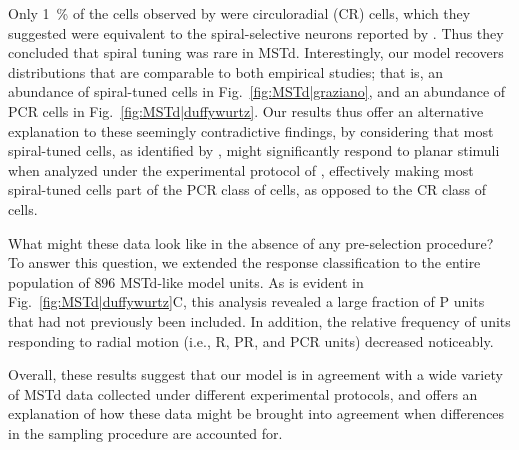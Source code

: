 Only \SI{1}{\percent} of the cells observed by \cite{DuffyWurtz1995} were
circuloradial (CR) cells, which they suggested were equivalent to the 
spiral-selective neurons reported by \cite{Graziano1994}. Thus they 
concluded that spiral tuning was rare in \ac{MSTd}. Interestingly, our 
model recovers distributions that are comparable to both empirical studies; 
that is, an abundance of spiral-tuned cells in Fig.~\ref{fig:MSTd|graziano},
and an abundance of PCR cells in Fig.~\ref{fig:MSTd|duffywurtz}. 
Our results thus offer an alternative explanation to these seemingly
contradictive findings, by considering that most spiral-tuned cells, as
identified by \cite{Graziano1994}, might significantly respond to planar 
stimuli when analyzed under the experimental protocol of \cite{DuffyWurtz1995},
effectively making most spiral-tuned cells part of the PCR class of cells, 
as opposed to the CR class of cells.

What might these data look like in the absence of any pre-selection procedure? 
To answer this question, we extended the response classification to the entire
population of $896$ \ac{MSTd}-like model units. As is evident in 
Fig.~\ref{fig:MSTd|duffywurtz}C, this analysis revealed a large fraction of
P units that had not previously been included. In addition, the relative
frequency of units responding to radial motion (i.e., R, PR, and PCR units)
decreased noticeably.

Overall, these results suggest that our model is in agreement with a wide 
variety of \ac{MSTd} data collected under different experimental protocols, 
and offers an explanation of how these data might be brought into agreement
when differences in the sampling procedure are accounted for.



